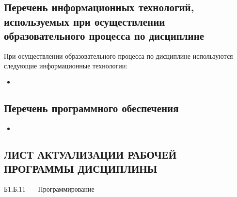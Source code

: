 \documentclass[a4paper,12pt]{article}
\begin{document}
\subsection{Перечень информационных технологий, используемых при осуществлении образовательного процесса по дисциплине}
При осуществлении образовательного процесса по дисциплине используются следующие информационные технологии:
\begin{itemize}[nolistsep]
\item 
\end{itemize}

\subsection{Перечень программного обеспечения}
\begin{itemize}[nolistsep]
\item 
\end{itemize}



\newpage
\begin{center}
\section*{ЛИСТ АКТУАЛИЗАЦИИ РАБОЧЕЙ ПРОГРАММЫ ДИСЦИПЛИНЫ}
Б1.Б.11\ --- Программирование 
\end{center}
\end{document}
